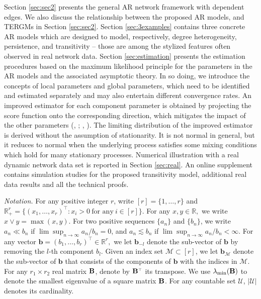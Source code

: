 \documentclass[12pt]{article}
\def\T{{\scriptscriptstyle \top} }
\newcommand{\bb}{{\mathbf b}}
\newcommand{\bB}{{\bf B}}
\newcommand{\0}{{\bf 0}}
\begin{document}
Section \ref{sec:sec2} presents the general AR network framework with dependent edges. 
We also discuss the relationship between the proposed AR models, and TERGMs in Section \ref{sec:sec2}. Section \ref{sec:3examples} contains three concrete AR models which are designed to model, respectively, degree heterogeneity, persistence, and transitivity -- those are among the stylized features often observed in real network data. Section \ref{sec:estimation} presents the estimation procedures based on the maximum likelihood principle for the parameters in the AR models and the associated asymptotic theory. In so doing, we introduce the concepts of local parameters and global parameters, which need to be identified and estimated separately and may also entertain different convergence rates. 
An improved estimator for each component parameter is obtained by projecting the score function onto the corresponding direction, which mitigates the impact of the other parameters (\citeauthor{ChangChenTangWu2021}, \citeyear{ChangChenTangWu2021}; \citeauthor{ChangShiZhang2023}, \citeyear{ChangShiZhang2023}).
The limiting distribution of the improved estimator is derived without the assumption of stationarity. It is not normal in general, but it reduces to normal when the underlying process satisfies some mixing conditions which hold for many stationary processes.
Numerical illustration with a real dynamic network data set is reported in Section \ref{sec:real}.
An online supplement contains simulation studies for the proposed transitivity model, additional real data results and all the technical proofs. 
  
{\it Notation.}  For any positive integer $r$, write $[r] = \{1,\dots, r\}$ and $\mathbb{R}_+^r=\{(x_1,\ldots,x_r)^{\T}:x_i>0~\textrm{for any}~i\in[r]\}$. For any $x, y \in \mathbb{R},$ we write $x \vee y = \max(x,y).$  For two positive sequences $\{a_n\}$ and $\{b_n\}$, we write $a_n\ll b_n$ if  $\lim \sup_{n \to \infty} a_n/b_n = 0$, and 
 $a_n \lesssim b_n$ if $\lim \sup_{n \to \infty} a_n/b_n <\infty$. 
For any vector $\bb = (b_1, \dots, b_r)^{\T} \in \mathbb{R}^r,$ we let $\bb_{-l}$ denote the sub-vector of $\bb$ by removing the $l$-th component $b_l$. Given an index set $\mathcal{M} \subset [r] $, we let $\bb_{\mathcal{M}}$ denote the sub-vector of $\bb$ that consists of the components of $\bb$ with the indices in $\mathcal{M}$.
For any $r_1 \times r_2$ real matrix $\bB$, denote by $\bB^{\T}$ its transpose. %
We use $\lambda_{\min}(\bB)$ to denote  the smallest eigenvalue of a square matrix $\bB$. For any countable set
$\mathcal{U}$, $|\mathcal{U}|$ denotes its cardinality.
\end{document}
